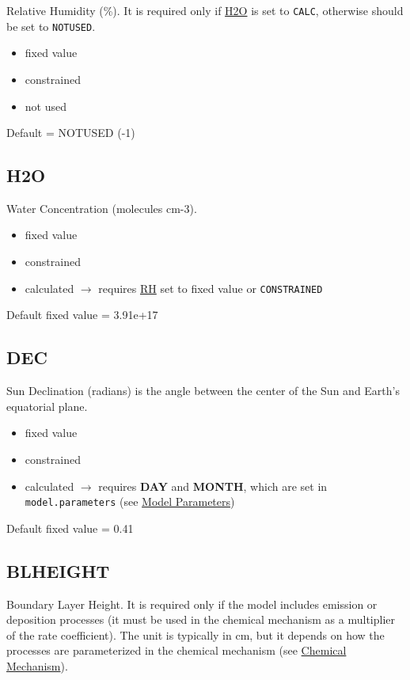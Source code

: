 Relative Humidity (\%). It is required only if
\hyperref[subsec:h2o]{H2O} is set to \texttt{CALC}, otherwise should
be set to \texttt{NOTUSED}.

\begin{itemize}
\item fixed value
\item constrained
\item not used
\end{itemize}

Default = NOTUSED (-1)

\subsection{H2O} \label{subsec:h2o}

Water Concentration (molecules cm-3).

\begin{itemize}
\item fixed value
\item constrained
\item calculated $\rightarrow$ requires \hyperref[subsec:rh]{RH} set
  to fixed value or \texttt{CONSTRAINED}
\end{itemize}

Default fixed value = 3.91e+17

\subsection{DEC} \label{subsec:dec}

Sun Declination (radians) is the angle between the center of the Sun
and Earth's equatorial plane.

\begin{itemize}
\item fixed value
\item constrained
\item calculated $\rightarrow$ requires \textbf{DAY} and
  \textbf{MONTH}, which are set in \texttt{model.parameters} (see
  \hyperref[sec:model-parameters]{Model Parameters})
\end{itemize}

Default fixed value = 0.41

\subsection{BLHEIGHT} \label{subsec:blheight}

Boundary Layer Height. It is required only if the model includes
emission or deposition processes (it must be used in the chemical
mechanism as a multiplier of the rate coefficient). The unit is
typically in cm, but it depends on how the processes are parameterized
in the chemical mechanism (see \hyperref[sec:chemical-mechanism]{Chemical
  Mechanism}).

